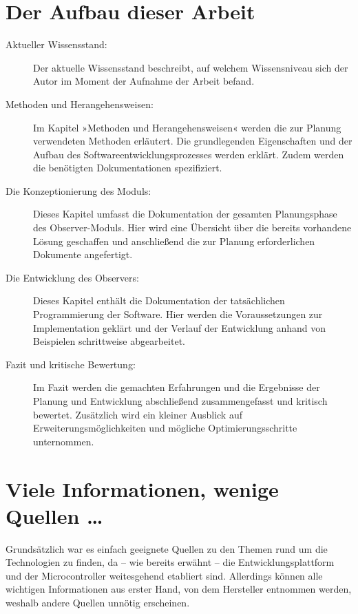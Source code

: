 \section{Der Aufbau dieser Arbeit}
\label{sec:AufbauDieserArbeit}

\begin{description}

	\item[Aktueller Wissensstand:] Der aktuelle Wissensstand beschreibt, auf welchem Wissensniveau sich der Autor im Moment der Aufnahme der Arbeit befand.
	
	\item[Methoden und Herangehensweisen:] Im Kapitel »Methoden und Herangehensweisen« werden die zur Planung verwendeten Methoden erl\"autert. Die grundlegenden Eigenschaften und der Aufbau des Softwareentwicklungsprozesses werden erkl\"art. Zudem werden die benötigten Dokumentationen spezifiziert.
	
	\item[Die Konzeptionierung des Moduls:] Dieses Kapitel umfasst die Dokumentation der gesamten Planungsphase des Observer-Moduls. Hier wird eine \"Ubersicht \"uber die bereits vorhandene L\"osung geschaffen und anschlie{\ss}end die zur Planung erforderlichen Dokumente angefertigt.
	
	\item[Die Entwicklung des Observers:] Dieses Kapitel enth\"alt die Dokumentation der tats\"achlichen Programmierung der Software. Hier werden die Voraussetzungen zur Implementation gekl\"art und der Verlauf der Entwicklung anhand von Beispielen schrittweise abgearbeitet.
	
	\item[Fazit und kritische Bewertung:] Im Fazit werden die gemachten Erfahrungen und die Ergebnisse der Planung und Entwicklung abschlie{\ss}end zusammengefasst und kritisch bewertet. Zus\"atzlich wird ein kleiner Ausblick auf Erweiterungsm\"oglichkeiten und m\"ogliche Optimierungsschritte unternommen.

\end{description}


\section{Viele Informationen, wenige Quellen \dots}
\label{sec:Quellenlage}

Grunds\"atzlich war es einfach geeignete Quellen zu den Themen rund um die Technologien zu finden, da -- wie bereits erw\"ahnt -- die Entwicklungsplattform und der Microcontroller weitesgehend etabliert sind. Allerdings können alle wichtigen Informationen aus erster Hand, von dem Hersteller entnommen werden, weshalb andere Quellen unn\"otig erscheinen.

